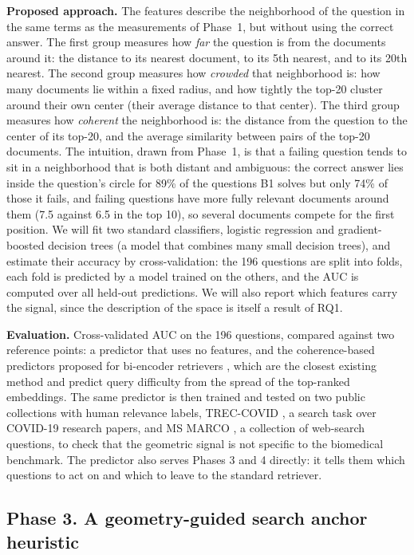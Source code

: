 \documentclass[12pt,a4paper]{article}
\begin{document}
\textbf{Proposed approach.} The features describe the neighborhood of the question in the same terms as the measurements of Phase~1, but without using the correct answer. The first group measures how \emph{far} the question is from the documents around it: the distance to its nearest document, to its 5th nearest, and to its 20th nearest. The second group measures how \emph{crowded} that neighborhood is: how many documents lie within a fixed radius, and how tightly the top-20 cluster around their own center (their average distance to that center). The third group measures how \emph{coherent} the neighborhood is: the distance from the question to the center of its top-20, and the average similarity between pairs of the top-20 documents. The intuition, drawn from Phase~1, is that a failing question tends to sit in a neighborhood that is both distant and ambiguous: the correct answer lies inside the question's circle for 89\% of the questions B1 solves but only 74\% of those it fails, and failing questions have more fully relevant documents around them (7.5 against 6.5 in the top 10), so several documents compete for the first position. We will fit two standard classifiers, logistic regression and gradient-boosted decision trees (a model that combines many small decision trees), and estimate their accuracy by cross-validation: the 196 questions are split into folds, each fold is predicted by a model trained on the others, and the AUC is computed over all held-out predictions. We will also report which features carry the signal, since the description of the space is itself a result of RQ1.

\textbf{Evaluation.} Cross-validated AUC on the 196 questions, compared against two reference points: a predictor that uses no features, and the coherence-based predictors proposed for bi-encoder retrievers \citep{vlachou2023coherence}, which are the closest existing method and predict query difficulty from the spread of the top-ranked embeddings. The same predictor is then trained and tested on two public collections with human relevance labels, TREC-COVID \citep{roberts2020treccovid}, a search task over COVID-19 research papers, and MS MARCO \citep{nguyen2016msmarco}, a collection of web-search questions, to check that the geometric signal is not specific to the biomedical benchmark. The predictor also serves Phases 3 and 4 directly: it tells them which questions to act on and which to leave to the standard retriever.

\subsection{Phase 3. A geometry-guided search anchor heuristic}
\end{document}
